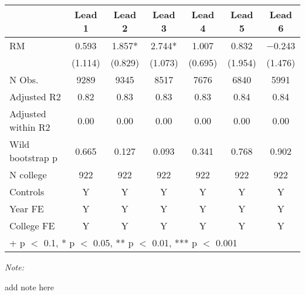 \begin{table}
\centering
\begin{threeparttable}
\begin{tabular}[t]{lcccccc}
\toprule
  & Lead 1 & Lead 2 & Lead 3 & Lead 4 & Lead 5 & Lead 6\\
\midrule
RM & \num{0.593} & \num{1.857}* & \num{2.744}* & \num{1.007} & \num{0.832} & \num{-0.243}\\
 & (\num{1.114}) & (\num{0.829}) & (\num{1.073}) & (\num{0.695}) & (\num{1.954}) & (\num{1.476})\\
\midrule
N Obs. & \num{9289} & \num{9345} & \num{8517} & \num{7676} & \num{6840} & \num{5991}\\
Adjusted R2 & \num{0.82} & \num{0.83} & \num{0.83} & \num{0.83} & \num{0.84} & \num{0.84}\\
Adjusted within R2 & \num{0.00} & \num{0.00} & \num{0.00} & \num{0.00} & \num{0.00} & \num{0.00}\\
Wild bootstrap p & 0.665 & 0.127 & 0.093 & 0.341 & 0.768 & 0.902\\
N college & 922 & 922 & 922 & 922 & 922 & 922\\
Controls & Y & Y & Y & Y & Y & Y\\
Year FE & Y & Y & Y & Y & Y & Y\\
College FE & Y & Y & Y & Y & Y & Y\\
\bottomrule
\multicolumn{7}{l}{\rule{0pt}{1em}+ p $<$ 0.1, * p $<$ 0.05, ** p $<$ 0.01, *** p $<$ 0.001}\\
\end{tabular}
\begin{tablenotes}
\item \textit{Note: } 
\item add note here
\end{tablenotes}
\end{threeparttable}
\end{table}
